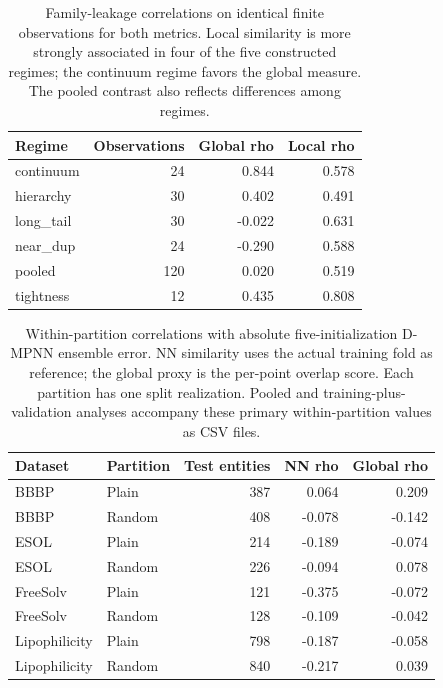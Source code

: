 \begin{table}[htbp]\centering\small
\begin{tabular}{lrrr}
\toprule
Regime & Observations & Global rho & Local rho \\
\midrule
continuum & 24 & 0.844 & 0.578 \\
hierarchy & 30 & 0.402 & 0.491 \\
long\_tail & 30 & -0.022 & 0.631 \\
near\_dup & 24 & -0.290 & 0.588 \\
pooled & 120 & 0.020 & 0.519 \\
tightness & 12 & 0.435 & 0.808 \\
\bottomrule
\end{tabular}

\caption{Family-leakage correlations on identical finite observations for both metrics. Local similarity is more strongly associated in four of the five constructed regimes; the continuum regime favors the global measure. The pooled contrast also reflects differences among regimes.}\end{table}
\begin{table}[htbp]\centering\small
\begin{tabular}{llrrr}
\toprule
Dataset & Partition & Test entities & NN rho & Global rho \\
\midrule
BBBP & Plain & 387 & 0.064 & 0.209 \\
BBBP & Random & 408 & -0.078 & -0.142 \\
ESOL & Plain & 214 & -0.189 & -0.074 \\
ESOL & Random & 226 & -0.094 & 0.078 \\
FreeSolv & Plain & 121 & -0.375 & -0.072 \\
FreeSolv & Random & 128 & -0.109 & -0.042 \\
Lipophilicity & Plain & 798 & -0.187 & -0.058 \\
Lipophilicity & Random & 840 & -0.217 & 0.039 \\
\bottomrule
\end{tabular}

\caption{Within-partition correlations with absolute five-initialization D-MPNN ensemble error. NN similarity uses the actual training fold as reference; the global proxy is the per-point overlap score. Each partition has one split realization. Pooled and training-plus-validation analyses accompany these primary within-partition values as CSV files.}\end{table}
